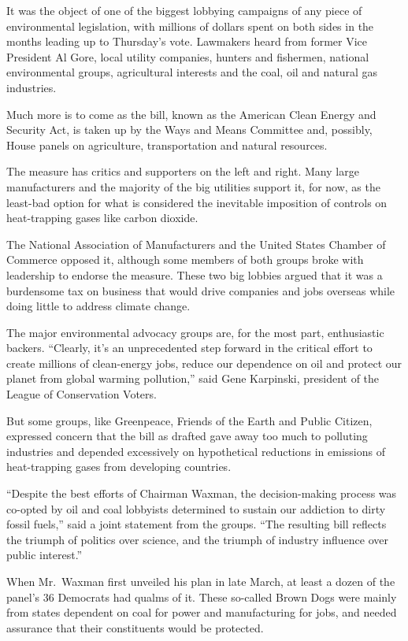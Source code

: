 \documentclass[12pt,a4paper,onecolumn]{article}
\begin{document}
It was the object of one of the biggest lobbying campaigns of any piece of environmental
legislation, with millions of dollars spent on both sides in the months leading up to Thursday's
vote. Lawmakers heard from former Vice President Al Gore, local utility companies, hunters and
fishermen, national environmental groups, agricultural interests and the coal, oil and natural gas
industries.

Much more is to come as the bill, known as the American Clean Energy and Security Act, is taken up
by the Ways and Means Committee and, possibly, House panels on agriculture, transportation and
natural resources.

The measure has critics and supporters on the left and right. Many large manufacturers and the
majority of the big utilities support it, for now, as the least-bad option for what is considered
the inevitable imposition of controls on heat-trapping gases like carbon dioxide.

The National Association of Manufacturers and the United States Chamber of Commerce opposed it,
although some members of both groups broke with leadership to endorse the measure. These two big
lobbies argued that it was a burdensome tax on business that would drive companies and jobs overseas
while doing little to address climate change.

The major environmental advocacy groups are, for the most part, enthusiastic backers. ``Clearly,
it's an unprecedented step forward in the critical effort to create millions of clean-energy jobs,
reduce our dependence on oil and protect our planet from global warming pollution,'' said Gene
Karpinski, president of the League of Conservation Voters.

But some groups, like Greenpeace, Friends of the Earth and Public Citizen, expressed concern that
the bill as drafted gave away too much to polluting industries and depended excessively on
hypothetical reductions in emissions of heat-trapping gases from developing countries.

``Despite the best efforts of Chairman Waxman, the decision-making process was co-opted by oil and
coal lobbyists determined to sustain our addiction to dirty fossil fuels,'' said a joint statement
from the groups. ``The resulting bill reflects the triumph of politics over science, and the triumph
of industry influence over public interest.''

When Mr.~Waxman first unveiled his plan in late March, at least a dozen of the panel's 36 Democrats
had qualms of it. These so-called Brown Dogs were mainly from states dependent on coal for power and
manufacturing for jobs, and needed assurance that their constituents would be protected.
\end{document}
